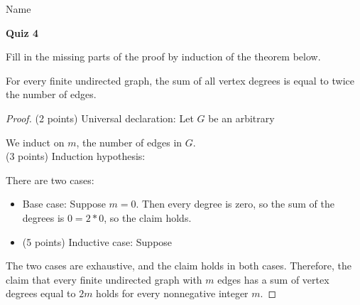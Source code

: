 \documentclass[11pt]{article}
\begin{document}
\noindent Name \underline{\hspace{12cm}}\\


\begin{center}
\LARGE\textbf{Quiz 4}%
\end{center}

Fill in the missing parts of the proof by induction of the theorem below.


\begin{theorem*}
    For every finite undirected graph, the sum of all vertex degrees is equal to
    twice the number of edges.
\end{theorem*}

\begin{proof}
\noindent (2 points) Universal declaration: Let $G$ be an arbitrary 
\vspace{.3in}

\noindent We induct on $m$, the number of edges in $G$.
\\

\noindent (3 points) Induction hypothesis:
\vspace{.8in}    

\noindent There are two cases:
\begin{itemize}
    \item 
Base case: Suppose $m=0$. Then every degree is zero, so the sum of the degrees is $0=2*0$, so the
claim holds.
\item (5 points) Inductive case: Suppose 
\vspace{3.8in}
\end{itemize}
\noindent The two cases are exhaustive, and the claim holds in both cases.
Therefore, the claim that every finite undirected graph with $m$ edges has a sum
of vertex degrees equal to $2m$ holds for every nonnegative integer $m$.

    
\end{proof}

\end{document}

